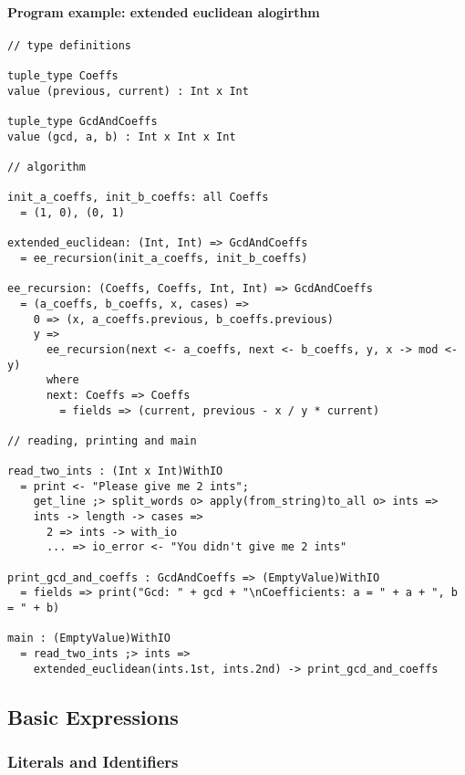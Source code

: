 \documentclass{article}
\begin{document}
\paragraph{Program example: extended euclidean alogirthm}
\begin{verbatim}
// type definitions

tuple_type Coeffs
value (previous, current) : Int x Int

tuple_type GcdAndCoeffs
value (gcd, a, b) : Int x Int x Int

// algorithm

init_a_coeffs, init_b_coeffs: all Coeffs
  = (1, 0), (0, 1)

extended_euclidean: (Int, Int) => GcdAndCoeffs
  = ee_recursion(init_a_coeffs, init_b_coeffs)

ee_recursion: (Coeffs, Coeffs, Int, Int) => GcdAndCoeffs
  = (a_coeffs, b_coeffs, x, cases) =>
    0 => (x, a_coeffs.previous, b_coeffs.previous)
    y =>
      ee_recursion(next <- a_coeffs, next <- b_coeffs, y, x -> mod <- y)
      where
      next: Coeffs => Coeffs
        = fields => (current, previous - x / y * current)

// reading, printing and main

read_two_ints : (Int x Int)WithIO
  = print <- "Please give me 2 ints";
    get_line ;> split_words o> apply(from_string)to_all o> ints =>
    ints -> length -> cases =>
      2 => ints -> with_io
      ... => io_error <- "You didn't give me 2 ints"
 
print_gcd_and_coeffs : GcdAndCoeffs => (EmptyValue)WithIO
  = fields => print("Gcd: " + gcd + "\nCoefficients: a = " + a + ", b = " + b)

main : (EmptyValue)WithIO
  = read_two_ints ;> ints =>
    extended_euclidean(ints.1st, ints.2nd) -> print_gcd_and_coeffs
\end{verbatim}

\subsection{Basic Expressions}

\subsubsection{Literals and Identifiers}
\end{document}
